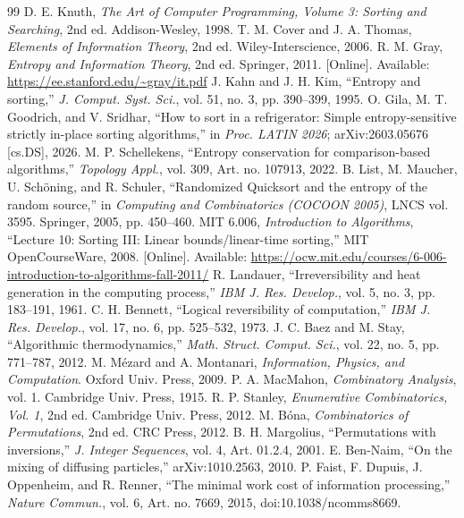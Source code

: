 \documentclass[10pt,journal]{IEEEtran}
\begin{document}
\begin{thebibliography}{99}
 D. E. Knuth, \emph{The Art of Computer Programming, Volume 3: Sorting and Searching}, 2nd ed. Addison-Wesley, 1998.
 T. M. Cover and J. A. Thomas, \emph{Elements of Information Theory}, 2nd ed. Wiley-Interscience, 2006.
 R. M. Gray, \emph{Entropy and Information Theory}, 2nd ed. Springer, 2011. [Online]. Available: \url{https://ee.stanford.edu/~gray/it.pdf}
 J. Kahn and J. H. Kim, ``Entropy and sorting,'' \emph{J. Comput. Syst. Sci.}, vol. 51, no. 3, pp. 390--399, 1995.
 O. Gila, M. T. Goodrich, and V. Sridhar, ``How to sort in a refrigerator: Simple entropy-sensitive strictly in-place sorting algorithms,'' in \emph{Proc. LATIN 2026}; arXiv:2603.05676 [cs.DS], 2026.
 M. P. Schellekens, ``Entropy conservation for comparison-based algorithms,'' \emph{Topology Appl.}, vol. 309, Art. no. 107913, 2022.
 B. List, M. Maucher, U. Sch\"oning, and R. Schuler, ``Randomized Quicksort and the entropy of the random source,'' in \emph{Computing and Combinatorics (COCOON 2005)}, LNCS vol. 3595. Springer, 2005, pp. 450--460.
 MIT 6.006, \emph{Introduction to Algorithms}, ``Lecture 10: Sorting III: Linear bounds/linear-time sorting,'' MIT OpenCourseWare, 2008. [Online]. Available: \url{https://ocw.mit.edu/courses/6-006-introduction-to-algorithms-fall-2011/}
 R. Landauer, ``Irreversibility and heat generation in the computing process,'' \emph{IBM J. Res. Develop.}, vol. 5, no. 3, pp. 183--191, 1961.
 C. H. Bennett, ``Logical reversibility of computation,'' \emph{IBM J. Res. Develop.}, vol. 17, no. 6, pp. 525--532, 1973.
 J. C. Baez and M. Stay, ``Algorithmic thermodynamics,'' \emph{Math. Struct. Comput. Sci.}, vol. 22, no. 5, pp. 771--787, 2012.
 M. M\'ezard and A. Montanari, \emph{Information, Physics, and Computation}. Oxford Univ. Press, 2009.
 P. A. MacMahon, \emph{Combinatory Analysis}, vol. 1. Cambridge Univ. Press, 1915.
 R. P. Stanley, \emph{Enumerative Combinatorics, Vol. 1}, 2nd ed. Cambridge Univ. Press, 2012.
 M. B\'ona, \emph{Combinatorics of Permutations}, 2nd ed. CRC Press, 2012.
 B. H. Margolius, ``Permutations with inversions,'' \emph{J. Integer Sequences}, vol. 4, Art. 01.2.4, 2001.
 E. Ben-Naim, ``On the mixing of diffusing particles,'' arXiv:1010.2563, 2010.
 P. Faist, F. Dupuis, J. Oppenheim, and R. Renner, ``The minimal work cost of information processing,'' \emph{Nature Commun.}, vol. 6, Art. no. 7669, 2015, doi:10.1038/ncomms8669.

\end{thebibliography}
\end{document}
